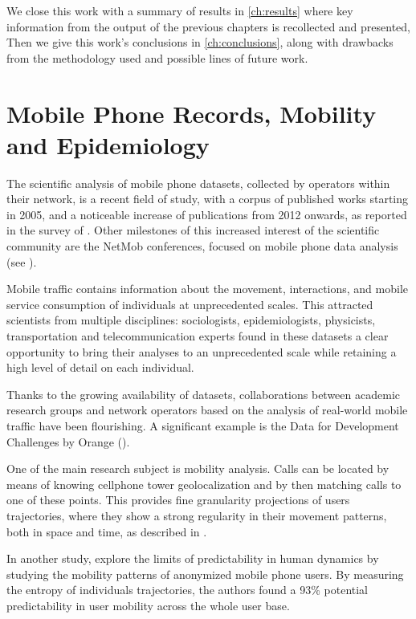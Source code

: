 We close this work with a summary of results in \cref{ch:results} where key information from the output of the previous chapters is recollected and presented,
Then we give this work's conclusions in \cref{ch:conclusions}, along with drawbacks from the methodology used and possible lines of future work.


\section{Mobile Phone Records, Mobility and Epidemiology}

The scientific analysis of mobile phone datasets, collected by operators within their network, is a recent field of study, with a corpus of published works starting in 2005, and a noticeable increase of publications from 2012 onwards, as reported in the survey of \cite{naboulsi2015mobile}. Other milestones of this increased interest of the scientific community are the NetMob conferences, focused on mobile phone data analysis (see \cite{netmob}).

Mobile traffic contains information about the movement, interactions, and mobile service consumption of individuals at unprecedented scales.
This attracted scientists from multiple disciplines:
sociologists, epidemiologists, physicists, transportation and telecommunication experts
found in these datasets a clear opportunity to bring their analyses to an unprecedented scale while retaining a high level of detail on each individual.

Thanks to the growing availability of datasets, collaborations between academic research groups and network operators based on the analysis of real-world mobile traffic have been flourishing. A significant example is the Data for Development Challenges by Orange (\cite{d4d}).

One of the main research subject is mobility analysis.
Calls can be located by means of knowing cellphone tower geolocalization and by then matching calls to one of these points.
This provides fine granularity projections of users trajectories, where they show a strong regularity in their movement patterns,
both in space and time, as described in \cite{gonzalez2008understanding}.

In another study, \cite{song2010limits} explore the limits of predictability in human dynamics by studying the mobility patterns of anonymized mobile phone users.
By measuring the entropy of individuals trajectories, the authors found a 93\% potential predictability in user mobility across the whole user base.

